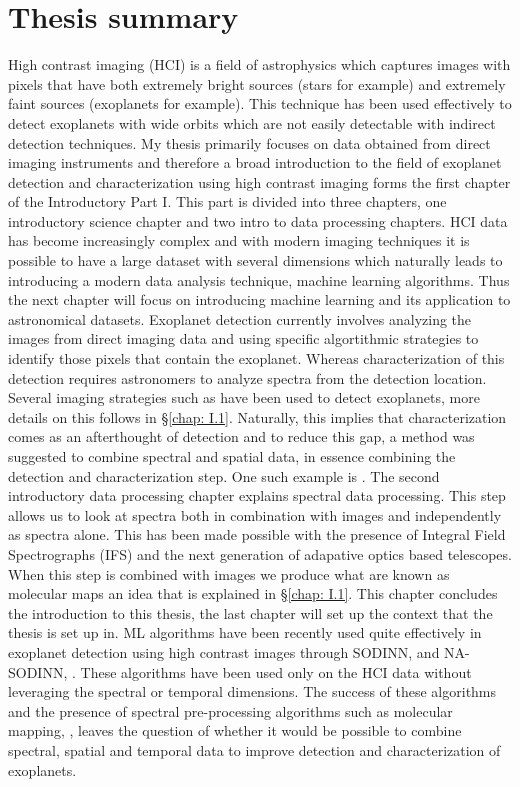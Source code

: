 \chapter*{Thesis summary}
High contrast imaging (HCI) is a field of astrophysics which captures images with pixels that have both extremely bright sources (stars for example) and extremely faint sources (exoplanets for example).
This technique has been used effectively to detect exoplanets with wide orbits which are not easily detectable with indirect detection techniques.
My thesis primarily focuses on data obtained from direct imaging instruments and therefore a broad introduction to the field of exoplanet detection and characterization\@
using high contrast imaging forms the first chapter of the Introductory Part I.
This part is divided into three chapters, one introductory science chapter and two intro to data processing chapters.
HCI data has become increasingly complex and with modern imaging techniques it is possible to have a large dataset with several dimensions which naturally leads to introducing a modern data analysis technique, machine learning algorithms.
Thus the next chapter will focus on introducing machine learning and its application to astronomical datasets.
Exoplanet detection currently involves analyzing the images from direct imaging data and using specific algortithmic strategies to identify those pixels that contain the exoplanet.
Whereas characterization of this detection requires astronomers to analyze spectra from the detection location.
Several imaging strategies such as \citep[ADI, ][]{2006MaroisADI} have been used to detect exoplanets, more details on this follows in 
\S\ref{chap: I.1}.
Naturally, this implies that characterization comes as an afterthought of detection and to reduce this gap, a method was suggested to combine spectral and spatial data, in essence combining the detection 
and characterization step.
One such example is \citet[][]{2002SparksSDI}.
The second introductory data processing chapter explains spectral data processing.
This step allows us to look at spectra both in combination with images and independently as spectra alone.
This has been made possible with the presence of Integral Field Spectrographs (IFS) and the next generation of adapative optics based 
telescopes.
When this step is combined with images we produce what are known as molecular maps an idea that is explained in 
\S\ref{chap: I.1}.
This chapter concludes the introduction to this thesis, the last chapter will set up the context that the thesis is set up in.
ML algorithms have been recently used quite effectively in exoplanet detection using high contrast images through SODINN, \citet[][]{2018Gomez}
and NA-SODINN, \citet[][]{2023Carlito}.
These algorithms have been used only on the HCI data without leveraging the spectral or temporal dimensions. 
The success of these algorithms and the presence of spectral pre-processing algorithms such as molecular mapping, \citet[][]{2018AHoeijmakersMM},
leaves the question of whether it would be possible to combine spectral, spatial and temporal data to improve detection and characterization of exoplanets.

